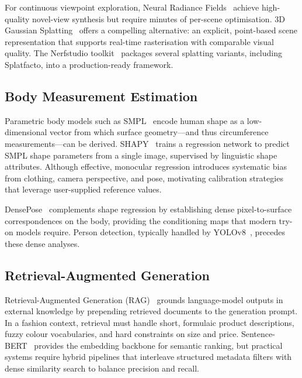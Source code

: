 For continuous viewpoint exploration, Neural Radiance Fields~\cite{mildenhall2020nerf} achieve high-quality novel-view synthesis but require minutes of per-scene optimisation. 3D Gaussian Splatting~\cite{kerbl2023gaussians} offers a compelling alternative: an explicit, point-based scene representation that supports real-time rasterisation with comparable visual quality. The Nerfstudio toolkit~\cite{tancik2023nerfstudio} packages several splatting variants, including Splatfacto, into a production-ready framework.

\subsection{Body Measurement Estimation}

Parametric body models such as SMPL~\cite{loper2015smpl} encode human shape as a low-dimensional vector from which surface geometry---and thus circumference measurements---can be derived. SHAPY~\cite{choutas2022shapy} trains a regression network to predict SMPL shape parameters from a single image, supervised by linguistic shape attributes. Although effective, monocular regression introduces systematic bias from clothing, camera perspective, and pose, motivating calibration strategies that leverage user-supplied reference values.

DensePose~\cite{guler2018densepose} complements shape regression by establishing dense pixel-to-surface correspondences on the body, providing the conditioning maps that modern try-on models require. Person detection, typically handled by YOLOv8~\cite{jocher2023yolov8}, precedes these dense analyses.

\subsection{Retrieval-Augmented Generation}

Retrieval-Augmented Generation (RAG)~\cite{lewis2020rag} grounds language-model outputs in external knowledge by prepending retrieved documents to the generation prompt. In a fashion context, retrieval must handle short, formulaic product descriptions, fuzzy colour vocabularies, and hard constraints on size and price. Sentence-BERT~\cite{reimers2019sbert} provides the embedding backbone for semantic ranking, but practical systems require hybrid pipelines that interleave structured metadata filters with dense similarity search to balance precision and recall.
